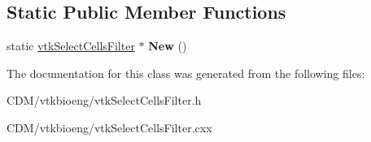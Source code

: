 \subsection*{Static Public Member Functions}
\begin{DoxyCompactItemize}
\item 
\hypertarget{classvtkSelectCellsFilter_af20036c6f49bd1a87adf1f713fae1d4e}{
static \hyperlink{classvtkSelectCellsFilter}{vtkSelectCellsFilter} $\ast$ {\bfseries New} ()}
\label{classvtkSelectCellsFilter_af20036c6f49bd1a87adf1f713fae1d4e}

\end{DoxyCompactItemize}


The documentation for this class was generated from the following files:\begin{DoxyCompactItemize}
\item 
CDM/vtkbioeng/vtkSelectCellsFilter.h\item 
CDM/vtkbioeng/vtkSelectCellsFilter.cxx\end{DoxyCompactItemize}

